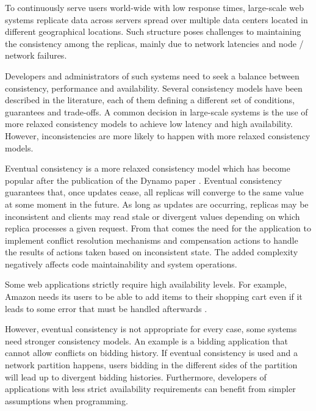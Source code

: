 \documentclass[doublespacing]{bmcart}
\begin{document}
To continuously serve users world-wide with low response times, large-scale web
systems replicate data across servers spread over multiple data centers located
in different geographical locations. Such structure poses challenges to
maintaining the consistency among the replicas, mainly due to network latencies
and node / network failures.

Developers and administrators of such systems need to seek a balance between
consistency, performance and availability. Several consistency models have been
described in the literature, each of them defining a different set of
conditions, guarantees and trade-offs. A common decision in large-scale systems
is the use of more relaxed consistency models to achieve low latency and high
availability. However, inconsistencies are more likely to happen with more
relaxed consistency models.

Eventual consistency is a more relaxed consistency model which has become
popular after the publication of the Dynamo paper \cite{DeCandia2007}. Eventual
consistency guarantees that, once updates cease, all replicas will converge to
the same value at some moment in the future. As long as updates are occurring,
replicas may be inconsistent and clients may read stale or divergent values
depending on which replica processes a given request. From that comes the need
for the application to implement conflict resolution mechanisms and compensation
actions to handle the results of actions taken based on inconsistent state. The
added complexity negatively affects code maintainability and system operations.

Some web applications strictly require high availability levels. For example,
Amazon needs its users to be able to add items to their shopping cart even if it
leads to some error that must be handled afterwards \cite{DeCandia2007}.

However, eventual consistency is not appropriate for every case, some systems
need stronger consistency models. An example is a bidding application that
cannot allow conflicts on bidding history. If eventual consistency is used and a
network partition happens, users bidding in the different sides of the partition
will lead up to divergent bidding histories. Furthermore, developers of
applications with less strict availability requirements can benefit from simpler
assumptions when programming.
\end{document}
